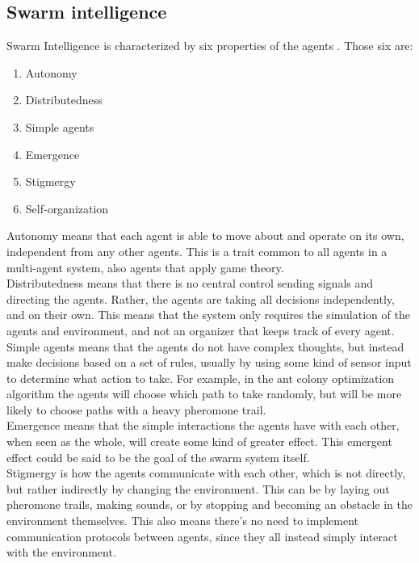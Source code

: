 \documentclass[a4paper,english]{report}
\begin{document}
	\subsection{Swarm intelligence}
	Swarm Intelligence is characterized by six properties of the agents \cite{bonabeau1999swarm}. Those six are:
	\begin{samepage}\begin{enumerate}
		\item Autonomy
		\item Distributedness
		\item Simple agents
		\item Emergence
		\item Stigmergy
		\item Self-organization
	\end{enumerate}\end{samepage}
	Autonomy means that each agent is able to move about and operate on its own, independent from any other agents. This is a trait common to all agents in a multi-agent system, also agents that apply game theory.\\
	Distributedness means that there is no central control sending signals and directing the agents. Rather, the agents are taking all decisions independently, and on their own. This means that the system only requires the simulation of the agents and environment, and not an organizer that keeps track of every agent.\\
	Simple agents means that the agents do not have complex thoughts, but instead make decisions based on a set of rules, usually by using some kind of sensor input to determine what action to take. For example, in the ant colony optimization algorithm the agents will choose which path to take randomly, but will be more likely to choose paths with a heavy pheromone trail.\\
	Emergence means that the simple interactions the agents have with each other, when seen as the whole, will create some kind of greater effect. This emergent effect could be said to be the goal of the swarm system itself.\\
	Stigmergy is how the agents communicate with each other, which is not directly, but rather indirectly by changing the environment. This can be by laying out pheromone trails, making sounds, or by stopping and becoming an obstacle in the environment themselves. This also means there's no need to implement communication protocols between agents, since they all instead simply interact with the environment.\\
\end{document}
